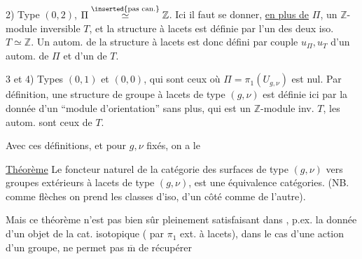 2) Type $(0,2)$, $\Pi\overset{\inserted{\text{pas can.}}}{\simeq}\mathbb{Z}$. Ici il faut se donner, \uline{en plus de} $\Pi$, un $\mathbb{Z}$-module inversible $T$, et la structure à lacets est définie par l'un des deux iso. $T\simeq\mathbb{Z}$. Un autom. de la structure à lacets est donc défini par   couple  $u_{\Pi},u_T$ d'un autom. de $\Pi$ et d'un de $T$.

3 et 4) Types $(0,1)$ et $(0,0)$, qui sont ceux où $\Pi=\pi_1(U_{g,\nu})$ est nul. Par définition, une structure de groupe à lacets de type $(g,\nu)$ est définie ici par la donnée d'un ``module d'orientation'' sans plus, qui est un $\mathbb{Z}$-module inv. $T$, les autom. sont ceux de $T$.

Avec ces définitions, et pour $g,\nu$ fixés, on a le

\uline{Théorème}  Le foncteur naturel de la catégorie  des surfaces de type $(g,\nu)$ vers   groupes extérieurs à lacets de type $(g,\nu)$, est une équivalence  catégories. (NB. comme flèches on prend les classes d'iso, d'un côté comme de l'autre).

Mais ce théorème n'est pas bien sûr pleinement satisfaisant dans , p.ex. la donnée d'un objet de la cat. isotopique ( par  $\pi_1$ ext. à lacets), dans le cas d'une action d'un groupe, ne permet pas $\overline{\mathrm m}$ de récupérer
